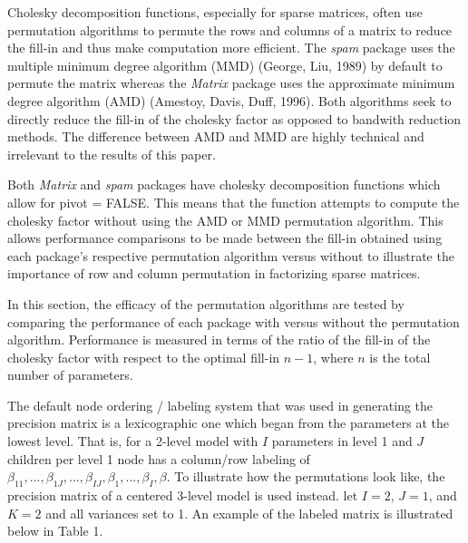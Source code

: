 \documentclass[]{article}
\begin{document}
Cholesky decomposition functions, especially for sparse matrices, often
use permutation algorithms to permute the rows and columns of a matrix
to reduce the fill-in and thus make computation more efficient. The
\emph{spam} package uses the multiple minimum degree algorithm (MMD)
(George, Liu, 1989) by default to permute the matrix whereas the
\emph{Matrix} package uses the approximate minimum degree algorithm
(AMD) (Amestoy, Davis, Duff, 1996). Both algorithms seek to directly
reduce the fill-in of the cholesky factor as opposed to bandwith
reduction methods. The difference between AMD and MMD are highly
technical and irrelevant to the results of this paper.

Both \emph{Matrix} and \emph{spam} packages have cholesky decomposition
functions which allow for pivot = FALSE. This means that the function
attempts to compute the cholesky factor without using the AMD or MMD
permutation algorithm. This allows performance comparisons to be made
between the fill-in obtained using each package's respective permutation
algorithm versus without to illustrate the importance of row and column
permutation in factorizing sparse matrices. \newline \newline \newline

 \newline 

In this section, the efficacy of the permutation algorithms are tested
by comparing the performance of each package with versus without the
permutation algorithm. Performance is measured in terms of the ratio of
the fill-in of the cholesky factor with respect to the optimal fill-in
\(n-1\), where \(n\) is the total number of parameters.

The default node ordering / labeling system that was used in generating
the precision matrix is a lexicographic one which began from the
parameters at the lowest level. That is, for a 2-level model with \(I\)
parameters in level 1 and \(J\) children per level 1 node has a
column/row labeling of
\(\beta_{11}, ..., \beta_{1J}, ..., \beta_{IJ}, \beta_1, ..., \beta_I, \beta\).
To illustrate how the permutations look like, the precision matrix of a
centered 3-level model is used instead. let \(I=2\), \(J=1\), and
\(K=2\) and all variances set to 1. An example of the labeled matrix is
illustrated below in Table 1.
\end{document}
